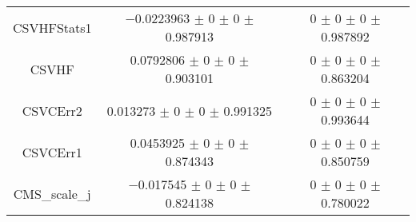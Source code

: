 \begin{table}
\begin{tabular}{ccc}
CSVHFStats1 	& \num{-0.0223963} $\pm$ \num{0} $\pm$ \num{0} $\pm$ \num{0.987913} 	& \num{0} $\pm$ \num{0} $\pm$ \num{0} $\pm$ \num{0.987892}\\
CSVHF 	& \num{0.0792806} $\pm$ \num{0} $\pm$ \num{0} $\pm$ \num{0.903101} 	& \num{0} $\pm$ \num{0} $\pm$ \num{0} $\pm$ \num{0.863204}\\
CSVCErr2 	& \num{0.013273} $\pm$ \num{0} $\pm$ \num{0} $\pm$ \num{0.991325} 	& \num{0} $\pm$ \num{0} $\pm$ \num{0} $\pm$ \num{0.993644}\\
CSVCErr1 	& \num{0.0453925} $\pm$ \num{0} $\pm$ \num{0} $\pm$ \num{0.874343} 	& \num{0} $\pm$ \num{0} $\pm$ \num{0} $\pm$ \num{0.850759}\\
CMS\_scale\_j 	& \num{-0.017545} $\pm$ \num{0} $\pm$ \num{0} $\pm$ \num{0.824138} 	& \num{0} $\pm$ \num{0} $\pm$ \num{0} $\pm$ \num{0.780022}\\
\bottomrule
\end{tabular}
\end{table}